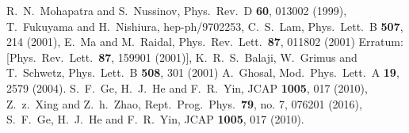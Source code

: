 \documentclass[11pt]{article}
\providecommand{\xlink}[1]
  {\href{http://arxiv.org/abs/#1}{arXiv:#1}}
\begin{document}
\begin{thebibliography}{9}

R.~N.~Mohapatra and S.~Nussinov,
  Phys.\ Rev.\ D {\bf 60}, 013002 (1999),
  T.~Fukuyama and H.~Nishiura,
  hep-ph/9702253,
 C.~S.~Lam,
  Phys.\ Lett.\ B {\bf 507}, 214 (2001),
  E.~Ma and M.~Raidal,
  Phys.\ Rev.\ Lett.\  {\bf 87}, 011802 (2001)
  Erratum: [Phys.\ Rev.\ Lett.\  {\bf 87}, 159901 (2001)],
  K.~R.~S.~Balaji, W.~Grimus and T.~Schwetz,
  Phys.\ Lett.\ B {\bf 508}, 301 (2001)
     A.~Ghosal,
  Mod.\ Phys.\ Lett.\ A {\bf 19}, 2579 (2004).
  S.~F.~Ge, H.~J.~He and F.~R.~Yin,
  JCAP {\bf 1005}, 017 (2010),
  Z.~z.~Xing and Z.~h.~Zhao,
  Rept.\ Prog.\ Phys.\  {\bf 79}, no. 7, 076201 (2016),
  S.~F.~Ge, H.~J.~He and F.~R.~Yin,
  JCAP {\bf 1005}, 017 (2010).
  

\end{thebibliography}
\end{document}
